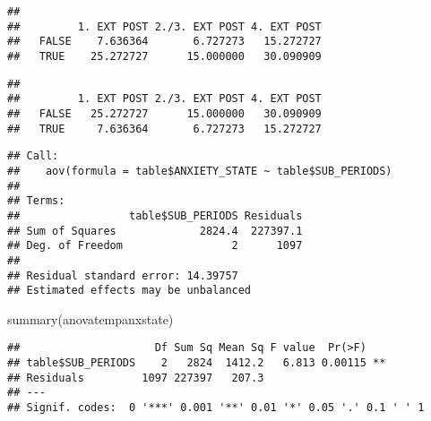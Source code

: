 \documentclass[
]{book}
\newenvironment{Shaded}{\begin{snugshade}}{\end{snugshade}}
\newcommand{\CommentTok}[1]{\textcolor[rgb]{0.56,0.35,0.01}{\textit{#1}}}
\newcommand{\DecValTok}[1]{\textcolor[rgb]{0.00,0.00,0.81}{#1}}
\newcommand{\FunctionTok}[1]{\textcolor[rgb]{0.00,0.00,0.00}{#1}}
\newcommand{\NormalTok}[1]{#1}
\newcommand{\OtherTok}[1]{\textcolor[rgb]{0.56,0.35,0.01}{#1}}
\newcommand{\SpecialCharTok}[1]{\textcolor[rgb]{0.00,0.00,0.00}{#1}}
\begin{document}
\begin{verbatim}
##        
##         1. EXT POST 2./3. EXT POST 4. EXT POST
##   FALSE    7.636364       6.727273   15.272727
##   TRUE    25.272727      15.000000   30.090909
\end{verbatim}

\begin{Shaded}
\end{Shaded}

\begin{verbatim}
##        
##         1. EXT POST 2./3. EXT POST 4. EXT POST
##   FALSE   25.272727      15.000000   30.090909
##   TRUE     7.636364       6.727273   15.272727
\end{verbatim}

\begin{Shaded}
\end{Shaded}

\begin{verbatim}
## Call:
##    aov(formula = table$ANXIETY_STATE ~ table$SUB_PERIODS)
## 
## Terms:
##                 table$SUB_PERIODS Residuals
## Sum of Squares             2824.4  227397.1
## Deg. of Freedom                 2      1097
## 
## Residual standard error: 14.39757
## Estimated effects may be unbalanced
\end{verbatim}

\begin{Shaded}
\begin{Highlighting}[]
\FunctionTok{summary}\NormalTok{(anovatempanxstate)}
\end{Highlighting}
\end{Shaded}

\begin{verbatim}
##                     Df Sum Sq Mean Sq F value  Pr(>F)   
## table$SUB_PERIODS    2   2824  1412.2   6.813 0.00115 **
## Residuals         1097 227397   207.3                   
## ---
## Signif. codes:  0 '***' 0.001 '**' 0.01 '*' 0.05 '.' 0.1 ' ' 1
\end{verbatim}
\end{document}
